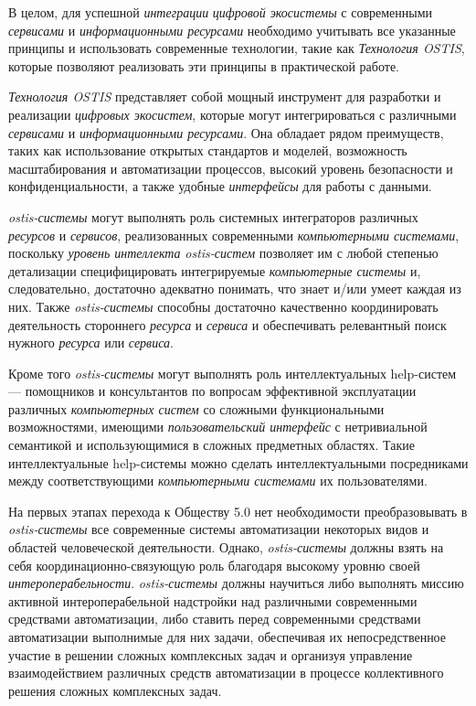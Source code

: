 В целом, для успешной \textit{интеграции} \textit{цифровой экосистемы} с современными \textit{сервисами} и \textit{информационными ресурсами} необходимо учитывать все указанные принципы и использовать современные технологии, такие как \textit{Технология OSTIS}, которые позволяют реализовать эти принципы в практической работе.

\textit{Технология OSTIS} представляет собой мощный инструмент для разработки и реализации \textit{цифровых экосистем}, которые могут интегрироваться с различными \textit{сервисами} и \textit{информационными ресурсами}. Она обладает рядом преимуществ, таких как использование открытых стандартов и моделей, возможность масштабирования и автоматизации процессов, высокий уровень безопасности и конфиденциальности, а также удобные \textit{интерфейсы} для работы с данными.

\textit{ostis-системы} могут выполнять роль системных интеграторов различных \textit{ресурсов} и \textit{сервисов}, реализованных современными \textit{компьютерными системами}, поскольку \textit{уровень интеллекта} \textit{ostis-систем} позволяет им с любой степенью детализации специфицировать интегрируемые \textit{компьютерные системы} и, следовательно, достаточно адекватно понимать, что знает и/или умеет каждая из них. Также \textit{ostis-системы} способны достаточно качественно координировать деятельность стороннего \textit{ресурса} и \textit{сервиса} и обеспечивать релевантный поиск нужного \textit{ресурса} или \textit{сервиса}.

Кроме того \textit{ostis-системы} могут выполнять роль интеллектуальных help-систем --- помощников и консультантов по вопросам эффективной эксплуатации различных \textit{компьютерных систем} со сложными функциональными возможностями, имеющими \textit{пользовательский интерфейс} с нетривиальной семантикой и использующимися в сложных предметных областях. 
Такие интеллектуальные help-системы можно сделать интеллектуальными посредниками между соответствующими \textit{компьютерными системами} их пользователями.

На первых этапах перехода к Обществу 5.0 нет необходимости преобразовывать в \textit{ostis-системы} все современные системы автоматизации некоторых видов и областей человеческой деятельности. 
Однако, \textit{ostis-системы} должны взять на себя координационно-связующую роль благодаря высокому уровню своей \textit{интероперабельности}. 
\textit{ostis-системы} должны научиться либо выполнять миссию активной интероперабельной надстройки над различными современными средствами автоматизации, либо ставить перед современными средствами автоматизации выполнимые для них задачи, обеспечивая их непосредственное участие в решении сложных комплексных задач и организуя управление взаимодействием различных средств автоматизации в процессе коллективного решения сложных комплексных задач.


